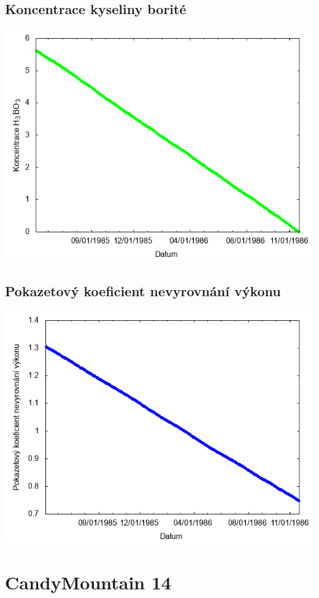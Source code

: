 \documentclass[a4paper,twoside,11pt]{article}
\begin{document}
\subsection*{Koncentrace kyseliny borité}
\begin{center}
\includegraphics[width=.8\textwidth]{graphs/CandyMountain_13_bc.png}
\end{center}

\subsection*{Pokazetový koeficient nevyrovnání výkonu}
\begin{center}
\includegraphics[width=.8\textwidth]{graphs/CandyMountain_13_fha.png}
\end{center}

\newpage
\section*{CandyMountain 14}
\end{document}
